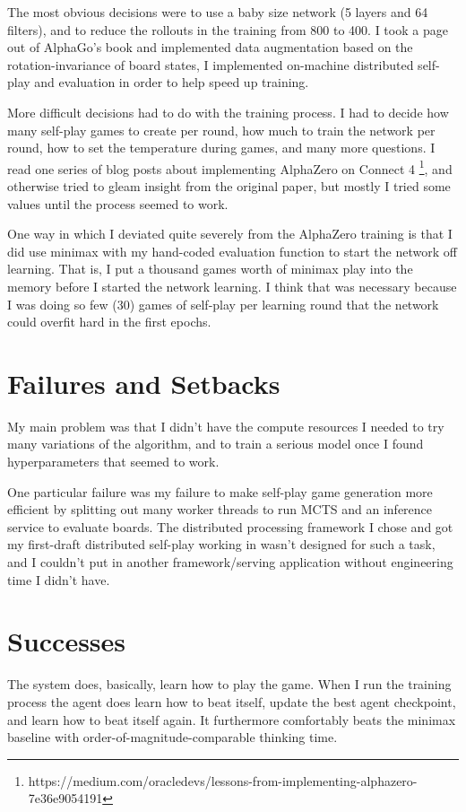 \documentclass{article}
\begin{document}
The most obvious decisions were to use a baby size network
(5 layers and 64 filters),
and to reduce the rollouts in the training from 800 to 400.
I took a page out of AlphaGo's book and implemented data augmentation
based on the rotation-invariance of board states,
I implemented on-machine distributed self-play and evaluation
in order to help speed up training.

More difficult decisions had to do with the training process.
I had to decide how many self-play games to create per round,
how much to train the network per round,
how to set the temperature during games,
and many more questions.
I read one series of blog posts about implementing AlphaZero on
Connect 4 \footnote{https://medium.com/oracledevs/lessons-from-implementing-alphazero-7e36e9054191},
and otherwise tried to gleam insight from the original paper,
but mostly I tried some values until the process seemed to work.

One way in which I deviated quite severely from the AlphaZero training
is that I did use minimax with my hand-coded evaluation function
to start the network off learning.
That is,
I put a thousand games worth of minimax play into the memory
before I started the network learning.
I think that was necessary because
I was doing so few (30) games of self-play per learning round
that the network could overfit hard in the first epochs.

\section*{Failures and Setbacks}

My main problem was that I didn't have the compute resources I needed
to try many variations of the algorithm,
and to train a serious model once I found hyperparameters that seemed to work.

One particular failure was my failure to
make self-play game generation more efficient by splitting out
many worker threads to run MCTS and an inference service to evaluate boards.
The distributed processing framework I chose and
got my first-draft distributed self-play working in wasn't designed for such a task,
and I couldn't put in another framework/serving application
without engineering time I didn't have.

\section*{Successes}

The system does, basically, learn how to play the game.
When I run the training process
the agent does learn how to beat itself,
update the best agent checkpoint,
and learn how to beat itself again.
It furthermore comfortably beats the minimax baseline
with order-of-magnitude-comparable thinking time.
\end{document}
